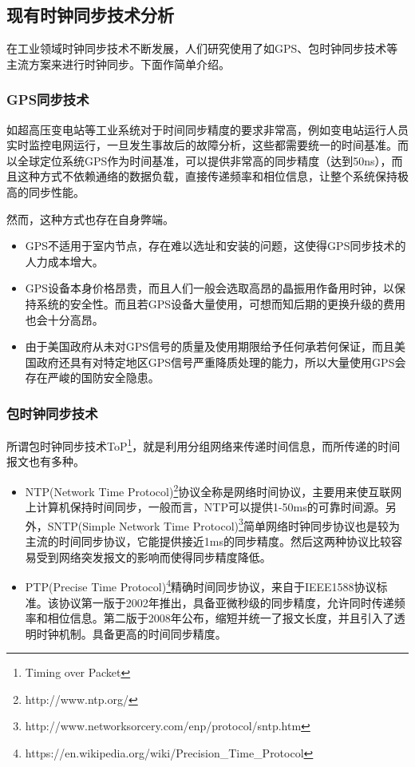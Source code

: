 \subsection{现有时钟同步技术分析}
\label{sec:sync_methods}
在工业领域时钟同步技术不断发展，人们研究使用了如GPS、包时钟同步技术等主流方案来进行时钟同步。下面作简单介绍。
\subsubsection{GPS同步技术}
如超高压变电站等工业系统对于时间同步精度的要求非常高，例如变电站运行人员实时监控电网运行，一旦发生事故后的故障分析，这些都需要统一的时间基准。而以全球定位系统GPS作为时间基准，可以提供非常高的同步精度（达到50ns），而且这种方式不依赖通络的数据负载，直接传递频率和相位信息，让整个系统保持极高的同步性能。

然而，这种方式也存在自身弊端。
\begin{itemize}[noitemsep,topsep=0pt,parsep=0pt,partopsep=0pt]
	\item GPS不适用于室内节点，存在难以选址和安装的问题，这使得GPS同步技术的人力成本增大。
	\item GPS设备本身价格昂贵，而且人们一般会选取高昂的晶振用作备用时钟，以保持系统的安全性。而且若GPS设备大量使用，可想而知后期的更换升级的费用也会十分高昂。
	\item 由于美国政府从未对GPS信号的质量及使用期限给予任何承若何保证，而且美国政府还具有对特定地区GPS信号严重降质处理的能力，所以大量使用GPS会存在严峻的国防安全隐患。
\end{itemize}

\subsubsection{包时钟同步技术}
所谓包时钟同步技术ToP\footnote{Timing over Packet}，就是利用分组网络来传递时间信息，而所传递的时间报文也有多种。
\begin{itemize}[noitemsep,topsep=0pt,parsep=0pt,partopsep=0pt]
	\item  NTP(Network Time Protocol)\footnote{http://www.ntp.org/}协议全称是网络时间协议，主要用来使互联网上计算机保持时间同步，一般而言，NTP可以提供1-50ms的可靠时间源。另外，SNTP(Simple Network Time Protocol)\footnote{http://www.networksorcery.com/enp/protocol/sntp.htm}简单网络时钟同步协议也是较为主流的时间同步协议，它能提供接近1ms的同步精度。然后这两种协议比较容易受到网络突发报文的影响而使得同步精度降低。
	\item PTP(Precise Time Protocol)\footnote{https://en.wikipedia.org/wiki/Precision\_Time\_Protocol}精确时间同步协议，来自于IEEE1588协议标准。该协议第一版于2002年推出，具备亚微秒级的同步精度，允许同时传递频率和相位信息。第二版于2008年公布，缩短并统一了报文长度，并且引入了透明时钟机制。具备更高的时间同步精度。
\end{itemize}

